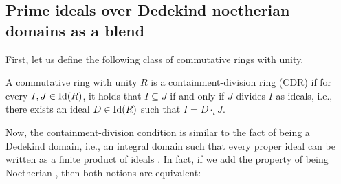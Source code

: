 \subsection{Prime ideals over Dedekind noetherian domains as a blend}

First, let us define the following class of commutative rings with unity.

\begin{definition}
A commutative ring with unity $R$ is a containment-division ring (CDR) if for every $I,J \in {\rm Id}(R)$, it holds that $I \subseteq J$ if and only if $J$ divides $I$ as ideals, i.e., there exists an ideal $D \in {\rm Id}(R)$ such that $I=D\cdot_{\iota}J$.
\end{definition}

Now, the containment-division condition is similar to the fact of being a Dedekind domain, i.e., an integral domain such that every proper ideal can be written as a finite product of ideals \cite[Theorem 37.1 and 37.8]{colemanmultidealtheory}. In fact, if we add the property of being Noetherian \cite{eisenbud}, then both notions are equivalent:

